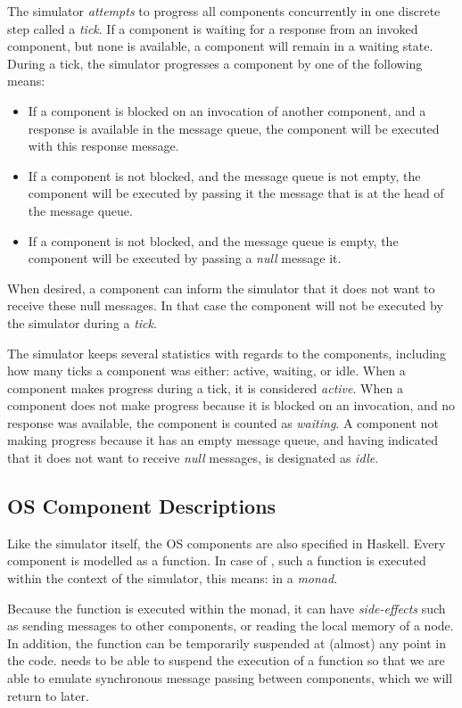 The simulator \emph{attempts} to progress all components concurrently in one discrete step called a \emph{tick}.
If a component is waiting for a response from an invoked component, but none is available, a component will remain in a waiting state.
During a tick, the simulator progresses a component by one of the following means:
\begin{itemize}
  \item If a component is blocked on an invocation of another component, and a response is available in the message queue, the component will be executed with this response message.
  \item If a component is not blocked, and the message queue is not empty, the component will be executed by passing it the message that is at the head of the message queue.
  \item If a component is not blocked, and the message queue is empty, the component will be executed by passing a \emph{null} message it.
\end{itemize}
When desired, a component can inform the simulator that it does not want to receive these null messages.
In that case the component will not be executed by the simulator during a \emph{tick}.

The simulator keeps several statistics with regards to the components, including how many ticks a component was either: active, waiting, or idle.
When a component makes progress during a tick, it is considered \emph{active}.
When a component does not make progress because it is blocked on an invocation, and no response was available, the component is counted as \emph{waiting}.
A component not making progress because it has an empty message queue, and having indicated that it does not want to receive \emph{null} messages, is designated as \emph{idle}.

\subsection{OS Component Descriptions}
Like the simulator itself, the OS components are also specified in Haskell. Every component is modelled as a function.
In case of \soosim, such a function is executed within the context of the simulator, this means: in a \emph{monad}.

Because the function is executed within the monad, it can have \emph{side-effects} such as sending messages to other components, or reading the local memory of a node.
In addition, the function can be temporarily suspended at (almost) any point in the code.
\soosim needs to be able to suspend the execution of a function so that we are able to emulate synchronous message passing between components, which we will return to later.

